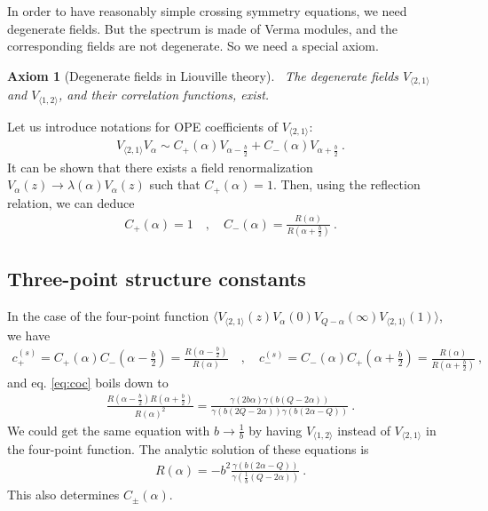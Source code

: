 \documentclass[12pt, a4paper]{article}
\theoremstyle{break}
\newtheorem{hyp}[exo]{Axiom}
\begin{document}
In order to have reasonably simple crossing symmetry equations, we need degenerate fields. But the spectrum is made of Verma modules, and the corresponding fields are not degenerate. So we need a special axiom.

\begin{hyp}[Degenerate fields in Liouville theory]
 ~\label{hyp:degl}
 The degenerate fields $V_{\langle 2, 1\rangle}$ and $V_{\langle 1, 2\rangle}$, and their correlation functions, exist. 
\end{hyp}

Let us introduce notations for OPE coefficients of $V_{\langle 2, 1\rangle}$:
\begin{align}
 V_{\langle 2, 1\rangle} V_\alpha \sim C_+(\alpha) V_{\alpha-\frac{b}{2}} + C_-(\alpha)V_{\alpha +\frac{b}{2}}\ .
\end{align}
It can be shown that there exists a field renormalization $V_\alpha(z) \to \lambda(\alpha)V_\alpha(z)$ such that $C_+(\alpha)=1$. 
Then, using the reflection relation, we can deduce
 \begin{align}
  C_+(\alpha) = 1\quad , \quad C_-(\alpha) = \frac{R(\alpha)}{R(\alpha+\frac{b}{2})}\ .
 \end{align}


\subsection{Three-point structure constants}

In the case of the four-point function $\Big\langle V_{\langle 2,1 \rangle}(z) V_\alpha(0) V_{Q-\alpha}(\infty) V_{\langle 2,1 \rangle}(1)\Big\rangle$, we have
\begin{align}
 c_{+}^{(s)} = C_+(\alpha)C_-(\alpha-\tfrac{b}{2}) = \frac{R(\alpha-\frac{b}{2})}{R(\alpha)} \quad , \quad c_{-}^{(s)} = C_-(\alpha)C_+(\alpha+\tfrac{b}{2}) = \frac{R(\alpha)}{R(\alpha+\frac{b}{2})}\ ,
\end{align}
and eq. \eqref{eq:coc} boils down to 
\begin{align}
 \frac{R(\alpha-\frac{b}{2})R(\alpha+\frac{b}{2})}{R(\alpha)^2} 
 = \frac{\gamma(2b\alpha)\gamma(b(Q-2\alpha))}{\gamma(b(2Q-2\alpha))\gamma(b(2\alpha-Q))}\ .
\end{align}
We could get the same equation with $b\to \frac{1}{b}$ by having $V_{\langle 1,2\rangle}$ instead of $V_{\langle 2,1\rangle}$ in the four-point function. The analytic solution of these equations is
\begin{align}
 R(\alpha) = -b^2  \frac{\gamma(b(2\alpha-Q))}{\gamma(\frac{1}{b}(Q-2\alpha))}\ .
\end{align}
This also determines $C_\pm(\alpha)$. 
\end{document}
